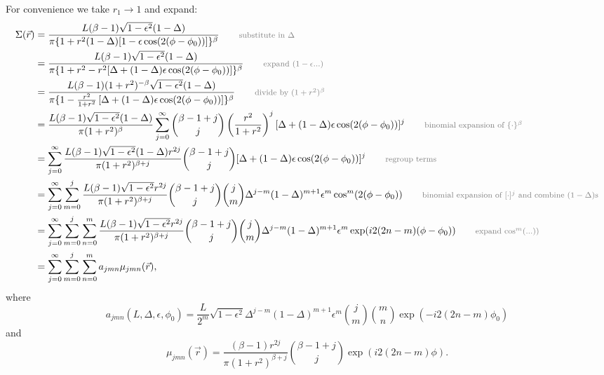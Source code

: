 \documentclass{article}
\newcommand*{\annot}[1]{\tag*{\footnotesize{\textcolor{gray}{#1}}}}
\begin{document}
For convenience we take $r_1 \rightarrow 1$ and expand:
\begin{align}
  \Sigma(\vec{r})
  &= \frac{L(\beta-1)\sqrt{1-\epsilon^2}(1-\Delta)}{\pi \{1+r^2(1-\Delta)[1-\epsilon\cos(2(\phi-\phi_0))]\}^\beta}
  \annot{substitute in $\Delta$} \\
  &= \frac{L(\beta-1)\sqrt{1-\epsilon^2}(1-\Delta)}{\pi \{1+r^2 - r^2[\Delta + (1-\Delta)\epsilon\cos(2(\phi-\phi_0))]\}^\beta}
  \annot{expand $(1-\epsilon ... )$} \\
  &= \frac{L(\beta-1) (1+r^2)^{-\beta}\sqrt{1-\epsilon^2}(1-\Delta)}{\pi \{1 - \frac{r^2}{1+r^2}\left[\Delta + (1-\Delta)\epsilon\cos(2(\phi-\phi_0))\right]\}^\beta}
  \annot{divide by $(1+r^2)^\beta$} \\
  &= \frac{L(\beta-1)\sqrt{1-\epsilon^2}(1-\Delta)}{\pi (1+r^2)^\beta}\sum_{j=0}^{\infty}\binom{\beta-1+j}{j}\left(\frac{r^2}{1+r^2}\right)^{j}[\Delta + (1-\Delta)\epsilon\cos(2(\phi-\phi_0))]^j
  \annot{binomial expansion of $\{\cdot\}^\beta$} \\
  &= \sum_{j=0}^{\infty}\frac{L (\beta-1)\sqrt{1-\epsilon^2}(1-\Delta) r^{2j}}{\pi (1+r^2)^{\beta+j}}\binom{\beta-1+j}{j}[\Delta + (1-\Delta)\epsilon\cos(2(\phi-\phi_0))]^j
  \annot{regroup terms} \\
  &= \sum_{j=0}^{\infty}\sum_{m=0}^{j}\frac{L (\beta-1) \sqrt{1-\epsilon^2} r^{2j}}{\pi (1+r^2)^{\beta+j}}\binom{\beta-1+j}{j}\binom{j}{m}\Delta^{j-m}(1-\Delta)^{m+1}\epsilon^m\cos^m(2(\phi-\phi_0))
  \annot{binomial expansion of $[\cdot]^j$ and combine $(1-\Delta)$s} \\
  &= \sum_{j=0}^{\infty}\sum_{m=0}^{j}\sum_{n=0}^{m}\frac{L (\beta-1) \sqrt{1-\epsilon^2} r^{2j}}{\pi (1+r^2)^{\beta+j}}\binom{\beta-1+j}{j}\binom{j}{m}\Delta^{j-m}(1-\Delta)^{m+1}\epsilon^m\exp(i 2 (2n-m) (\phi-\phi_0))
  \annot{expand $\cos^m(...))$} \\
  &= \sum_{j=0}^{\infty}\sum_{m=0}^{j}\sum_{n=0}^{m} a_{jmn}\mu_{jmn}(\vec{r}),
\end{align}
where
\begin{equation}
  a_{jmn}(L, \Delta, \epsilon, \phi_0) = \frac{L}{2^m} \sqrt{1-\epsilon^2} \Delta^{j-m}(1-\Delta)^{m+1}\epsilon^m\binom{j}{m}\binom{m}{n}\exp(-i 2 (2n-m) \phi_0)
\end{equation}
and
\begin{equation}
  \mu_{jmn}(\vec{r}) = \frac{(\beta-1)r^{2j}}{\pi (1+r^2)^{\beta+j}}\binom{\beta-1+j}{j}\exp(i 2 (2n-m) \phi).
\end{equation}
\end{document}
